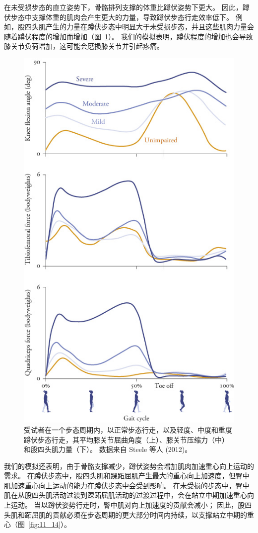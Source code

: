 在未受损步态的直立姿势下，骨骼排列支撑的体重比蹲伏姿势下更大。
因此，蹲伏步态中支撑体重的肌肉会产生更大的力量，导致蹲伏步态行走效率低下。
例如，股四头肌产生的力量在蹲伏步态中明显大于未受损步态，并且这些肌肉力量会随着蹲伏程度的增加而增加（图~\ref{fig:11_15}）。
我们的模拟表明，蹲伏程度的增加也会导致膝关节负荷增加，这可能会磨损膝关节并引起疼痛。


\begin{figure}[!htb]
	\centering
	\includegraphics[width=0.8\linewidth]{chap11/11_15}
	\caption{受试者在一个步态周期内，以正常步态行走，以及轻度、中度和重度蹲伏步态行走，其平均膝关节屈曲角度（上）、膝关节压缩力（中）和股四头肌力量（下）。
		数据来自 Steele 等人 (2012)。 \label{fig:11_15}}
\end{figure}


我们的模拟还表明，由于骨骼支撑减少，蹲伏姿势会增加肌肉加速重心向上运动的需求。
在蹲伏步态中，股四头肌和踝跖屈肌产生最大的重心向上加速度，但臀中肌加速重心向上运动的能力在蹲伏步态中会受到影响。
在未受损的步态中，臀中肌在从股四头肌活动过渡到踝跖屈肌活动的过渡过程中，会在站立中期加速重心向上运动。
当以蹲伏姿势行走时，臀中肌对向上加速度的贡献会减小；
因此，股四头肌和跖屈肌的贡献必须在步态周期的更大部分时间内持续，以支撑站立中期的重心（图~\ref{fig:11_14}）。


